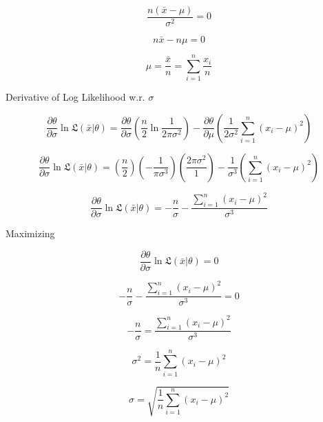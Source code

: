 \documentclass[12pt]{report}
\begin{document}
\begin{equation}
\frac{n \left(\bar{x} - \mu\right)}{\sigma^2} = 0
\end{equation}

\begin{equation}
n \bar{x} - n \mu = 0
\end{equation}

\begin{equation}
\mu = \frac{\bar{x}}{n} = \sum_{i=1}^{n} \frac{x_i}{n}
\end{equation}

Derivative of Log Likelihood w.r. $\sigma$

\begin{equation}
\frac{\partial \theta}{\partial \sigma} \ln \mathfrak{L}(\bar{x}|\theta) = \frac{\partial \theta}{\partial \sigma} \left( \frac{n}{2} \ln \frac{1}{2\pi\sigma^2}\right) - \frac{\partial \theta}{\partial \mu} \left(\frac{1}{2\sigma^2} \sum_{i=1}^n (x_i - \mu)^2\right)
\end{equation}

\begin{equation}
\frac{\partial \theta}{\partial \sigma} \ln \mathfrak{L}(\bar{x}|\theta) = \left(\frac{n}{2}\right) \left(-\frac{1}{\pi \sigma^{3}}\right) \left(\frac{2\pi\sigma^2}{1}\right) - \frac{1}{\sigma^3} \left( \sum_{i=1}^n (x_i - \mu)^2 \right) 
\end{equation}

\begin{equation}
\frac{\partial \theta}{\partial \sigma} \ln \mathfrak{L}(\bar{x}|\theta) = -\frac{n}{\sigma} - \frac{ \sum_{i=1}^n (x_i - \mu)^2}{\sigma^3}
\end{equation}

Maximizing

\begin{equation}
\frac{\partial \theta}{\partial \sigma} \ln \mathfrak{L}(\bar{x}|\theta) = 0
\end{equation}

\begin{equation}
-\frac{n}{\sigma} - \frac{ \sum_{i=1}^n (x_i - \mu)^2}{\sigma^3} = 0
\end{equation}

\begin{equation}
-\frac{n}{\sigma} = \frac{ \sum_{i=1}^n (x_i - \mu)^2}{\sigma^3}
\end{equation}

\begin{equation}
\sigma^2 = \frac{1}{n} \sum_{i=1}^n (x_i - \mu)^2
\end{equation}


\begin{equation}
\sigma = \sqrt{\frac{1}{n} \sum_{i=1}^n (x_i - \mu)^2}
\end{equation}

\end{document}
